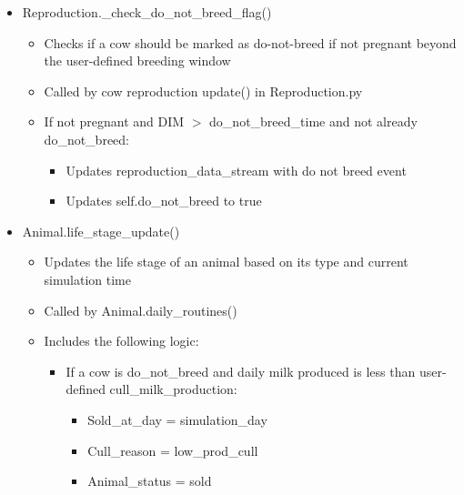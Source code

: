\begin{refsection}
\begin{enumerate}
        \begin{itemize}
            \item Reproduction.\_check\_do\_not\_breed\_flag()
            \begin{itemize}
                \item Checks if a cow should be marked as do-not-breed if not pregnant beyond the user-defined breeding window 
                \item Called by cow reproduction update() in Reproduction.py 
                \item If not pregnant and DIM \(>\) do\_not\_breed\_time and not already do\_not\_breed:
                \begin{itemize}
                    \item Updates reproduction\_data\_stream with do not breed event
                    \item Updates self.do\_not\_breed to true
                \end{itemize}
            \end{itemize}
            \item Animal.life\_stage\_update()
            \begin{itemize}
                \item Updates the life stage of an animal based on its type and current simulation time
                \item Called by Animal.daily\_routines() 
                \item Includes the following logic: 
                \begin{itemize}
                    \item If a cow is do\_not\_breed and daily milk produced is less than user-defined cull\_milk\_production: 
                    \begin{itemize}
                        \item Sold\_at\_day = simulation\_day 
                        \item Cull\_reason = low\_prod\_cull
                        \item Animal\_status = sold 
                    \end{itemize}
                \end{itemize}
            \end{itemize}
        \end{itemize}
    
    \end{enumerate}


\end{refsection}
